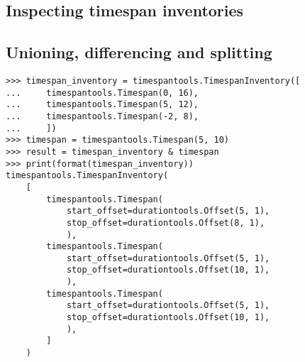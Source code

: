 \subsection{Inspecting timespan inventories}

\begin{comment}
TimespanInventory.all_are_contiguous
TimespanInventory.all_are_nonoverlapping
\end{comment}

\subsection{Unioning, differencing and splitting}

\begin{comment}
<abjad>
timespan_inventory = timespantools.TimespanInventory([
    timespantools.Timespan(0, 16),
    timespantools.Timespan(5, 12),
    timespantools.Timespan(-2, 8),
    ])
timespan = timespantools.Timespan(5, 10)
result = timespan_inventory & timespan
print(format(timespan_inventory))
</abjad>
\end{comment}

\begin{singlespacing}
\vspace{-0.5\baselineskip}
\begin{lstlisting}
>>> timespan_inventory = timespantools.TimespanInventory([
...     timespantools.Timespan(0, 16),
...     timespantools.Timespan(5, 12),
...     timespantools.Timespan(-2, 8),
...     ])
>>> timespan = timespantools.Timespan(5, 10)
>>> result = timespan_inventory & timespan
>>> print(format(timespan_inventory))
timespantools.TimespanInventory(
    [
        timespantools.Timespan(
            start_offset=durationtools.Offset(5, 1),
            stop_offset=durationtools.Offset(8, 1),
            ),
        timespantools.Timespan(
            start_offset=durationtools.Offset(5, 1),
            stop_offset=durationtools.Offset(10, 1),
            ),
        timespantools.Timespan(
            start_offset=durationtools.Offset(5, 1),
            stop_offset=durationtools.Offset(10, 1),
            ),
        ]
    )
\end{lstlisting}
\end{singlespacing}

\begin{comment}
<abjad>
timespan_inventory = timespantools.TimespanInventory([
    timespantools.Timespan(0, 16),
    timespantools.Timespan(5, 12),
    timespantools.Timespan(-2, 8),
    ])
timespan = timespantools.Timespan(5, 10)
result = timespan_inventory - timespan
print(format(timespan_inventory))
</abjad>
\end{comment}

